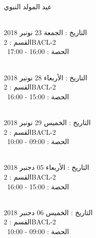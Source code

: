 \indent
  عيد المولد النبوي
\par
\noindent\makebox[\linewidth]{\rule{\paperwidth}{0.4pt}}
 \\
التاريخ : الجمعة 23 نونبر 2018 \\
القسم : 2BACL-2 \\
 \  
الحصة : 16:00 - 17:00 \\
\par
\noindent\makebox[\linewidth]{\rule{\paperwidth}{0.4pt}}
 \\
التاريخ : الأربعاء 28 نونبر 2018 \\
القسم : 2BACL-2 \\
 \  
الحصة : 15:00 - 16:00 \\
\par
\noindent\makebox[\linewidth]{\rule{\paperwidth}{0.4pt}}
 \\
التاريخ : الخميس 29 نونبر 2018 \\
القسم : 2BACL-2 \\
 \  
الحصة : 09:00 - 10:00 \\
\par
\noindent\makebox[\linewidth]{\rule{\paperwidth}{0.4pt}}
 \\
التاريخ : الأربعاء 05 دجنبر 2018 \\
القسم : 2BACL-2 \\
 \  
الحصة : 15:00 - 16:00 \\
\par
\noindent\makebox[\linewidth]{\rule{\paperwidth}{0.4pt}}
 \\
التاريخ : الخميس 06 دجنبر 2018 \\
القسم : 2BACL-2 \\
 \  
الحصة : 09:00 - 10:00 \\
